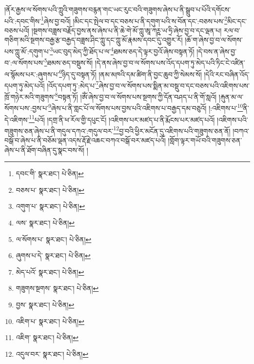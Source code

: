།ནོར་རྒྱས་ལ་སོགས་པའི་ཀླུའི་གཟུགས་བརྙན་གང་ཡང་རུང་བའི་གཟུགས་ཞེས་པ་ནི་སྒྲུབ་པ་པོའི་དགོངས་པའི་:དབང་གིས་\footnote{དབང་གི་  སྣར་ཐང་།  པེ་ཅིན། }ཞེས་བྱ་བའོ། །མིང་དང་སྤེལ་བ་དང་བཅས་པ་ནི་དགུག་པའི་ས་བོན་དང་:བཅས་པས་\footnote{བཅས་པ་  སྣར་ཐང་།  པེ་ཅིན། }མིང་དང་བཅས་པའོ། །སྔགས་བཟླས་བརྗོད་བྱས་ནས་ཞེས་པ་ནི་ཆེ་གེ་མོ་ཀླུ་ཨཱ་ཀཪྵ་ཡ་ཧྲི་ཞེས་བྱ་བ་དང་ལྡན་པ། རལ་བ་གཅིག་མའི་སྔགས་བརྒྱ་རྩ་བརྒྱད་བཟླས་ཤིང་ཀླུ་དང་ཀླུ་མོ་རྣམས་དབང་དུ་འགྱུར་རོ། །ཆོ་ག་ཞེས་བྱ་བ་ལ་སོགས་པས་ཀླུ་མོ་:དགུག་པ་\footnote{འགུག་པ་  སྣར་ཐང་།  པེ་ཅིན། }ཡང་བུད་མེད་ཀྱི་ཐོད་པ་ལ་\footnote{ལས་  སྣར་ཐང་།  པེ་ཅིན། }ཐམས་ཅད་དེ་ལྟར་བྱའོ་ཞེས་བསྟན་ཏོ། །དེ་བས་ན་ཞེས་བྱ་བ་:ལ་སོགས་པས་\footnote{ལ་སོགས་པ་  སྣར་ཐང་།  པེ་ཅིན། }ཐམས་ཅད་བསྡུས་སོ། །དེ་ནས་ཞེས་བྱ་བ་ལ་སོགས་པས་འོད་དཔག་ཏུ་མེད་པའི་ཏིང་ངེ་འཛིན་ལ་སྙོམས་པར་:ཞུགས་པ་\footnote{ཞུགས་པ་དེ་  སྣར་ཐང་།  པེ་ཅིན། }ཉིད་དུ་བསྟན་ཏོ། །ནམ་མཁའི་དམ་ཚིག་ནི་བྱང་ཆུབ་ཀྱི་སེམས་སོ། །དེའི་རང་བཞིན་འོད་དཔག་ཏུ་མེད་པའོ། །འོད་དཔག་ཏུ་:མེད་པ་\footnote{མེད་པའོ་  སྣར་ཐང་།  པེ་ཅིན། }ཞེས་བྱ་བ་ལ་སོགས་པས་སྨིན་མ་བསྡུ་བ་དང་བཅས་པའི་འཇིགས་པས་ཁྲོ་གཉེར་མའི་གཟུགས་\footnote{གཟུགས་སྔགས་  སྣར་ཐང་།  པེ་ཅིན། }བསྟན་ཏོ། །ཨོཾ་ཞེས་བྱ་བ་ལ་སོགས་པས་སྔགས་ཀྱི་དོན་བཤད་པ་ནི་གོ་སླའོ། །རྐུན་མ་ལ་སོགས་པས་:བྱས་པ་\footnote{བྱས་  སྣར་ཐང་།  པེ་ཅིན། }ཞེས་པ་ནི་གླང་པོ་ལ་སོགས་པས་བྱས་པའི་འཇིགས་པ་བརྒྱད་དམ་བཅུའོ། །:འཇིགས་པ་\footnote{འཇིག་པ་  སྣར་ཐང་།  པེ་ཅིན། }ནི་དེ་འཇིགས་\footnote{འཇིག་  སྣར་ཐང་།  པེ་ཅིན། }པའོ། །དགྲ་ནི་ཕ་རོལ་གྱི་དཔུང་ངོ། །འཇིགས་པར་མཛད་པ་ནི་རྨོངས་པར་མཛད་པའོ། །འཇིགས་པའི་གཟུགས་ཅན་ཞེས་པ་ནི་གདུལ་དཀའ་:གདུལ་བར་\footnote{འདུལ་བར་  སྣར་ཐང་།  པེ་ཅིན། }བྱ་བའི་ཕྱིར་མངོན་དུ་འཇིགས་པའི་གཟུགས་ཅན་ནོ། །བཀའ་བསྒོ་བ་ཞེས་པ་ནི་བཅོམ་ལྡན་འདས་རྡོ་རྗེ་འཆང་བཀའ་བསྒོ་བར་མཛད་པའོ། །གློག་ལྟར་གཡོ་བའི་གཟུགས་ཅན་ཞེས་པ་ནི་ཐོག་བཞིན་དུ་སྣང་བས་སོ། །
